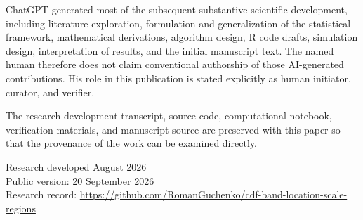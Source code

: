 \documentclass[11pt]{article}
\begin{document}
\begin{titlepage}
\begin{minipage}{0.90\textwidth}
ChatGPT generated most of the subsequent substantive scientific
development, including literature exploration, formulation and
generalization of the statistical framework, mathematical derivations,
algorithm design, R code drafts, simulation design, interpretation of
results, and the initial manuscript text.  The named human therefore
does not claim conventional authorship of those AI-generated
contributions.  His role in this publication is stated explicitly as
human initiator, curator, and verifier.

The research-development transcript, source code, computational
notebook, verification materials, and manuscript source are preserved
with this paper so that the provenance of the work can be examined
directly.
\end{minipage}

\vfill

{\small
Research developed August 2026\\
Public version: 20 September 2026\\
Research record: \url{https://github.com/RomanGuchenko/cdf-band-location-scale-regions}
\par}

\end{titlepage}
\end{document}
